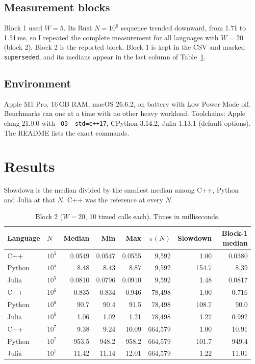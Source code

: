\documentclass[11pt,a4paper]{article}
\newcommand{\code}[1]{\texttt{#1}}
\newcommand{\tenp}[1]{10^{#1}}
\begin{document}
\subsection*{Measurement blocks}
Block 1 used $W = 5$. Its Rust $N=\tenp{6}$ sequence trended downward, from 1.71 to 1.51\,ms, so I
repeated the complete measurement for all languages with $W = 20$ (block 2). Block 2 is the reported
block. Block 1 is kept in the CSV and marked \code{superseded}, and its medians appear in the last
column of Table~\ref{tab:results}.

\subsection*{Environment}
Apple M1 Pro, 16\,GB RAM, macOS 26.6.2, on battery with Low Power Mode off. Benchmarks ran one at a
time with no other heavy workload. Toolchains: Apple clang 21.0.0 with \code{-O3 -std=c++17},
CPython 3.14.2, Julia 1.13.1 (default options). The README lists the exact commands.

\section{Results}

Slowdown is the median divided by the smallest median among C++, Python and Julia at that $N$. C++
was the reference at every $N$.

\begin{table}[H]
\centering
\caption{Block 2 ($W = 20$, 10 timed calls each). Times in milliseconds.}
\label{tab:results}
\begin{tabular}{llrrrrrr}
\toprule
Language & $N$ & Median & Min & Max & $\pi(N)$ & Slowdown & Block-1 median \\
\midrule
C++    & $\tenp{5}$ & 0.0549 & 0.0547 & 0.0555 & 9,592   & 1.00  & 0.0380 \\
Python & $\tenp{5}$ & 8.48   & 8.43   & 8.87   & 9,592   & 154.7 & 8.39   \\
Julia  & $\tenp{5}$ & 0.0810 & 0.0796 & 0.0910 & 9,592   & 1.48  & 0.0817 \\
\midrule
C++    & $\tenp{6}$ & 0.835  & 0.834  & 0.946  & 78,498  & 1.00  & 0.716  \\
Python & $\tenp{6}$ & 90.7   & 90.4   & 91.5   & 78,498  & 108.7 & 90.0   \\
Julia  & $\tenp{6}$ & 1.06   & 1.02   & 1.21   & 78,498  & 1.27  & 0.992  \\
\midrule
C++    & $\tenp{7}$ & 9.38   & 9.24   & 10.09  & 664,579 & 1.00  & 10.91  \\
Python & $\tenp{7}$ & 953.5  & 948.2  & 958.2  & 664,579 & 101.7 & 949.4  \\
Julia  & $\tenp{7}$ & 11.42  & 11.14  & 12.01  & 664,579 & 1.22  & 11.01  \\
\bottomrule
\end{tabular}
\end{table}
\end{document}
